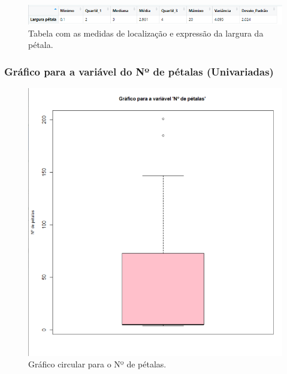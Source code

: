 \documentclass{article}
\begin{document}
\begin{figure}[h]
       \centering %
        \includegraphics[scale=0.8]{tabela_largura.png}
       \caption{Tabela com as medidas de localização e expressão da largura da pétala.}
       \label{fig:logo}
    \end{figure}
    
\paragraph{}

\paragraph{}



\subsubsection{Gráfico para a variável do Nº de pétalas (Univariadas)}
\begin{figure}[h]
       \centering %
        \includegraphics[scale=0.45]{grafico_no_de_petalas.png} 
       \caption{Gráfico circular para o Nº de pétalas.}
       \label{fig:logo}
    \end{figure}
    
\end{document}
